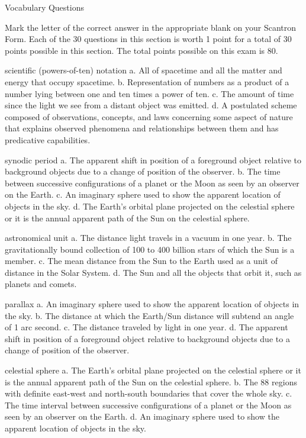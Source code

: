 

Vocabulary Questions

    Mark the letter of the correct answer in the appropriate blank on your Scantron Form. Each of the 30 questions in this section is worth 1 point for a total of 30 points possible in this section. The total points possible on this exam is 80.

    scientific (powers-of-ten) notation
    a. All of spacetime and all the matter and energy that occupy spacetime.
    b. Representation of numbers as a product of a number lying between one and ten times a power of ten.
    c. The amount of time since the light we see from a distant object was emitted.
    d. A postulated scheme composed of observations, concepts, and laws concerning some aspect of nature that explains observed phenomena and relationships between them and has predicative capabilities.

    synodic period
    a. The apparent shift in position of a foreground object relative to background objects due to a change of position of the observer.
    b. The time between successive configurations of a planet or the Moon as seen by an observer on the Earth.
    c. An imaginary sphere used to show the apparent location of objects in the sky.
    d. The Earth's orbital plane projected on the celestial sphere or it is the annual apparent path of the Sun on the celestial sphere.

    astronomical unit
    a. The distance light travels in a vacuum in one year.
    b. The gravitationally bound collection of 100 to 400 billion stars of which the Sun is a member.
    c. The mean distance from the Sun to the Earth used as a unit of distance in the Solar System.
    d. The Sun and all the objects that orbit it, such as planets and comets.

    parallax
    a. An imaginary sphere used to show the apparent location of objects in the sky.
    b. The distance at which the Earth/Sun distance will subtend an angle of 1 arc second.
    c. The distance traveled by light in one year.
    d. The apparent shift in position of a foreground object relative to background objects due to a change of position of the observer.

    celestial sphere
    a. The Earth's orbital plane projected on the celestial sphere or it is the annual apparent path of the Sun on the celestial sphere.
    b. The 88 regions with definite east-west and north-south boundaries that cover the whole sky.
    c. The time interval between successive configurations of a planet or the Moon as seen by an observer on the Earth.
    d. An imaginary sphere used to show the apparent location of objects in the sky.

